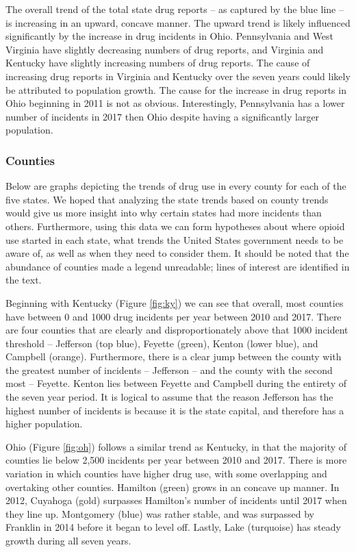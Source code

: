 \documentclass[12pt, letterpaper]{article}
\begin{document}
The overall trend of the total state drug reports -- as captured by the blue line -- is increasing in an upward, concave manner. The upward trend is likely influenced significantly by the increase in drug incidents in Ohio. Pennsylvania and West Virginia have slightly decreasing numbers of drug reports, and Virginia and Kentucky have slightly increasing numbers of drug reports. The cause of increasing drug reports in  Virginia and Kentucky over the seven years could likely be attributed to population growth. The cause for the increase in drug reports in Ohio beginning in 2011 is not as obvious. Interestingly, Pennsylvania has a lower number of incidents in 2017 then Ohio despite having a significantly larger population.

\subsubsection{Counties}
Below are graphs depicting the trends of drug use in every county for each of the five states. We hoped that analyzing the state trends based on county trends would give us more insight into why certain states had more incidents than others. Furthermore, using this data we can form hypotheses about where opioid use started in each state, what trends the United States government needs to be aware of, as well as when they need to consider them. It should be noted that the abundance of counties made a legend unreadable; lines of interest are identified in the text.

Beginning with Kentucky (Figure \ref{fig:ky}) we can see that overall, most counties have between 0 and 1000 drug incidents per year between 2010 and 2017. There are four counties that are clearly and disproportionately above that 1000 incident threshold -- Jefferson (top blue), Feyette (green), Kenton (lower blue), and Campbell (orange). Furthermore, there is a clear jump between the county with the greatest number of incidents -- Jefferson -- and the county with the second most -- Feyette. Kenton lies between Feyette and Campbell during the entirety of the seven year period. It is logical to assume that the reason Jefferson has the highest number of incidents is because it is the state capital, and therefore has a higher population.

Ohio (Figure \ref{fig:oh}) follows a similar trend as Kentucky, in that the majority of counties lie below 2,500 incidents per year between 2010 and 2017. There is more variation in which counties have higher drug use, with some overlapping and overtaking other counties. Hamilton (green) grows in an  concave up manner. In 2012, Cuyahoga (gold) surpasses Hamilton's number of incidents until 2017 when they line up. Montgomery (blue) was rather stable, and was surpassed by Franklin in 2014 before it began to level off. Lastly, Lake (turquoise) has steady growth during all seven years.
\end{document}
